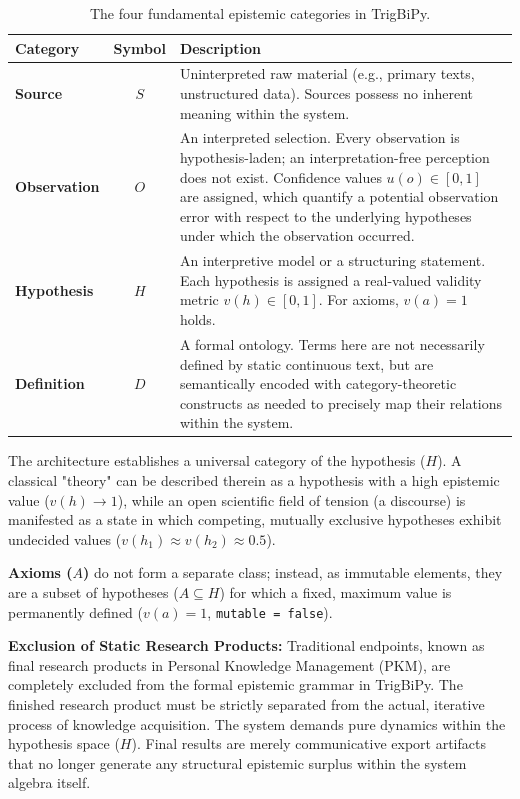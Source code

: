 \documentclass[11pt, a4paper]{article}
\begin{document}
	\begin{table}[ht]
		\centering
		\begin{tabular}{l c p{10cm}}
			\toprule
			\textbf{Category} & \textbf{Symbol} & \textbf{Description} \\
			\midrule
			\textbf{Source} & $S$ & Uninterpreted raw material (e.g., primary texts, unstructured data). Sources possess no inherent meaning within the system. \\
			\addlinespace
			\textbf{Observation} & $O$ & An interpreted selection. Every observation is hypothesis-laden; an interpretation-free perception does not exist. Confidence values $u(o) \in [0, 1]$ are assigned, which quantify a potential observation error with respect to the underlying hypotheses under which the observation occurred. \\
			\addlinespace
			\textbf{Hypothesis} & $H$ & An interpretive model or a structuring statement. Each hypothesis is assigned a real-valued validity metric $v(h) \in [0, 1]$. For axioms, $v(a) = 1$ holds.\\
			\addlinespace
			\textbf{Definition} & $D$ & A formal ontology. Terms here are not necessarily defined by static continuous text, but are semantically encoded with category-theoretic constructs as needed to precisely map their relations within the system. \\
			\bottomrule
		\end{tabular}
		\caption{The four fundamental epistemic categories in TrigBiPy.}
	\end{table}
	
	The architecture establishes a universal category of the hypothesis ($H$). A classical "theory" can be described therein as a hypothesis with a high epistemic value ($v(h) \to 1$), while an open scientific field of tension (a discourse) is manifested as a state in which competing, mutually exclusive hypotheses exhibit undecided values ($v(h_1) \approx v(h_2) \approx 0.5$).
	
	\textbf{Axioms ($A$)} do not form a separate class; instead, as immutable elements, they are a subset of hypotheses ($A \subseteq H$) for which a fixed, maximum value is permanently defined ($v(a) = 1$, \texttt{mutable = false}).
	
	\textbf{Exclusion of Static Research Products:} Traditional endpoints, known as final research products in Personal Knowledge Management (PKM), are completely excluded from the formal epistemic grammar in TrigBiPy. The finished research product must be strictly separated from the actual, iterative process of knowledge acquisition. The system demands pure dynamics within the hypothesis space ($H$). Final results are merely communicative export artifacts that no longer generate any structural epistemic surplus within the system algebra itself.
	
\end{document}
